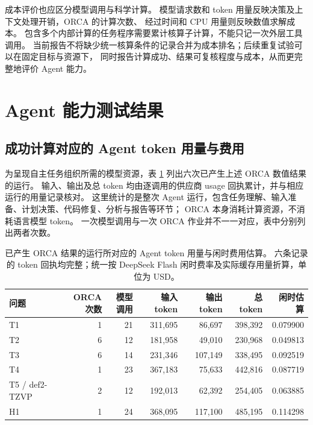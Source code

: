 \documentclass[UTF8,fontset=fandol,a4paper,11pt]{ctexart}
\begin{document}
成本评价也应区分模型调用与科学计算。%
模型请求数和 token 用量反映决策及上下文处理开销，ORCA 的计算次数、%
经过时间和 CPU 用量则反映数值求解成本。%
包含多个内部计算的任务程序需要累计核算子计算，不能只记一次外层工具调用。%
当前报告不将缺少统一核算条件的记录合并为成本排名；后续重复试验可以在固定目标与资源下，%
同时报告计算成功、结果可复核程度与成本，从而更完整地评价 Agent 能力。

\section{Agent 能力测试结果}



\subsection{成功计算对应的 Agent token 用量与费用}
\label{sec:token-cost}
为呈现自主任务组织所需的模型资源，表 \ref{tab:token-cost} 列出六次已产生上述 ORCA 数值结果的运行。%
输入、输出及总 token 均由逐调用的供应商 usage 回执累计，并与相应运行的用量记录核对。%
这里统计的是整次 Agent 运行，包含任务理解、输入准备、计划决策、代码修复、分析与报告等环节；%
ORCA 本身消耗计算资源，不消耗语言模型 token。%
一次模型调用与一次 ORCA 作业并不一一对应，表中分别列出两者次数。

\begin{table}[htbp]
  \centering\small
  \setlength{\tabcolsep}{4pt}
  \caption{已产生 ORCA 结果的运行所对应的 Agent token 用量与闲时费用估算。%
  六条记录的 token 回执均完整；统一按 DeepSeek Flash 闲时费率及实际缓存用量折算，单位为 USD。%
  }
  \label{tab:token-cost}
  \begin{tabular}{lrrrrrr}
    \toprule
    问题 & ORCA 次数 & 模型调用 & 输入 token & 输出 token & 总 token & 闲时估算\\
    \midrule
    T1 & 1 & 21 & 311,695 & 86,697 & 398,392 & 0.079900\\
    T2 & 6 & 12 & 181,958 & 49,010 & 230,968 & 0.049813\\
    T3 & 6 & 14 & 231,346 & 107,149 & 338,495 & 0.092519\\
    T4 & 1 & 23 & 367,183 & 75,633 & 442,816 & 0.087719\\
    T5 / def2-TZVP & 2 & 12 & 192,013 & 62,392 & 254,405 & 0.063885\\
    H1 & 1 & 24 & 368,095 & 117,100 & 485,195 & 0.114298\\
    \bottomrule
  \end{tabular}
\end{table}
\end{document}
